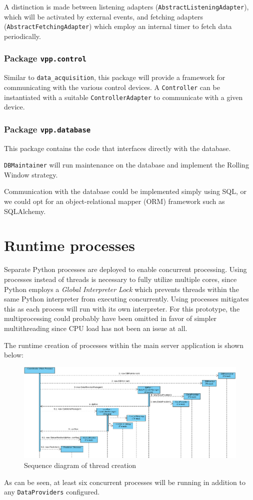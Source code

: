 A distinction is made between listening adapters (\texttt{AbstractListeningAdapter}), which will be activated by external events, and fetching adapters (\texttt{AbstractFetchingAdapter}) which employ an internal timer to fetch data periodically.

\subsubsection{Package \texttt{vpp.control}}
Similar to \texttt{data\_acquisition}, this package will provide a framework for communicating with the various control devices. A \texttt{Controller} can be instantiated with a suitable \texttt{ControllerAdapter} to communicate with a given device. 


\subsubsection{Package \texttt{vpp.database}}
This package contains the code that interfaces directly with the database. 

\texttt{DBMaintainer} will run maintenance on the database and implement the Rolling Window strategy.

Communication with the database could be implemented simply using SQL, or we could opt for an object-relational mapper (ORM) framework such as SQLAlchemy.


\section{Runtime processes}

Separate Python processes are deployed to enable concurrent processing. Using processes instead of threads is necessary to fully utilize multiple cores, since Python employs a \emph{Global Interpreter Lock} which prevents threads within the same Python interpreter from executing concurrently. Using processes mitigates this as each process will run with its own interpreter. For this prototype, the multiprocessing could probably have been omitted in favor of simpler multithreading since CPU load has not been an issue at all.

The runtime creation of processes within the main server application is shown below:
\begin{figure}[H]
    \centering
    \includegraphics[width=\textwidth]{figures/seq_diagram}
    \caption{Sequence diagram of thread creation}
    \label{figureSeqDiagram}
\end{figure}
As can be seen, at least six concurrent processes will be running in addition to any \texttt{DataProviders} configured.



